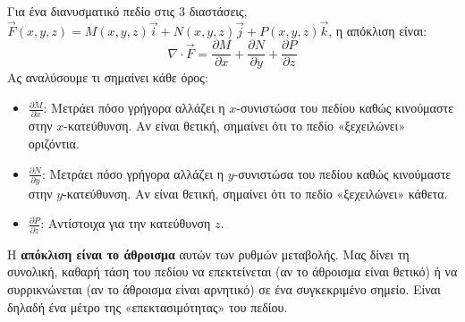 \documentclass[a4paper,12pt,twoside]{article}
\begin{document}
Για ένα διανυσματικό πεδίο στις 3 διαστάσεις, $\vec{F}(x,y,z) = M(x,y,z)\vec{i} + N(x,y,z)\vec{j} + P(x,y,z)\vec{k}$, η απόκλιση είναι:
\[ \nabla \cdot \vec{F} = \frac{\partial M}{\partial x} + \frac{\partial N}{\partial y} + \frac{\partial P}{\partial z} \]
Ας αναλύσουμε τι σημαίνει κάθε όρος:
\begin{itemize}
    \item $\frac{\partial M}{\partial x}$: Μετράει πόσο γρήγορα αλλάζει η $x$-συνιστώσα του πεδίου καθώς κινούμαστε στην $x$-κατεύθυνση. Αν είναι θετική, σημαίνει ότι το πεδίο «ξεχειλώνει» οριζόντια.
    \item $\frac{\partial N}{\partial y}$: Μετράει πόσο γρήγορα αλλάζει η $y$-συνιστώσα του πεδίου καθώς κινούμαστε στην $y$-κατεύθυνση. Αν είναι θετική, σημαίνει ότι το πεδίο «ξεχειλώνει» κάθετα.
    \item $\frac{\partial P}{\partial z}$: Αντίστοιχα για την κατεύθυνση $z$.
\end{itemize}

Η \textbf{απόκλιση είναι το άθροισμα} αυτών των ρυθμών μεταβολής. Μας δίνει τη συνολική, καθαρή τάση του πεδίου να επεκτείνεται (αν το άθροισμα είναι θετικό) ή να συρρικνώνεται (αν το άθροισμα είναι αρνητικό) σε ένα συγκεκριμένο σημείο. Είναι δηλαδή ένα μέτρο της «επεκτασιμότητας» του πεδίου.
\end{document}
